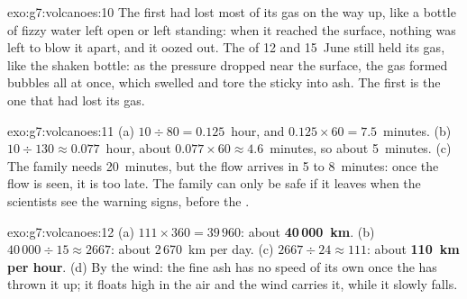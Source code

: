 \begin{solution}{exo:g7:volcanoes:10}
The first  had lost most of its gas on the way up, like a bottle of
fizzy water left open or left standing: when it reached the surface,
nothing was left to blow it apart, and it oozed out. The  of 12 and
15~June still held its gas, like the shaken bottle: as the pressure
dropped near the surface, the gas formed bubbles all at once, which
swelled and tore the sticky  into ash. The first  is the one
that had lost its gas.
\end{solution}

\begin{solution}{exo:g7:volcanoes:11}
(a) $10 \div 80 = 0.125$~hour, and $0.125 \times 60 = 7.5$~minutes. (b)
$10 \div 130 \approx 0.077$~hour, about $0.077 \times 60 \approx
4.6$~minutes, so about 5~minutes. (c) The family needs 20~minutes, but the
flow arrives in 5 to 8~minutes: once the flow is seen, it is too late. The
family can only be safe if it leaves when the scientists see the warning
signs, before the .
\end{solution}

\begin{solution}{exo:g7:volcanoes:12}
(a) $111 \times 360 = 39\,960$: about \textbf{40\,000~km}. (b)
$40\,000 \div 15 \approx 2667$: about 2\,670~km per day. (c)
$2667 \div 24 \approx 111$: about \textbf{110~km per hour}. (d) By the
wind: the fine ash has no speed of its own once the  has thrown
it up; it floats high in the air and the wind carries it, while it slowly
falls.
\end{solution}

